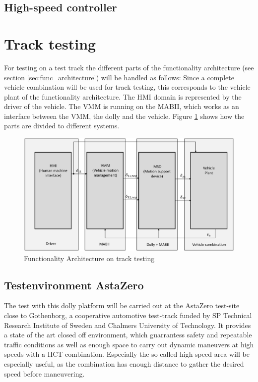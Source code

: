 \documentclass[ExampleMasters.tex]{subfiles}
\begin{document}
\subsection{High-speed controller}

\section{Track testing}
\label{sec:track-testing}
For testing on a test track the different parts of the  functionality architecture (see section \ref{sec:func_architecture}) will be handled as follows:
Since a complete vehicle combination will be used for track testing, this corresponds to the vehicle plant of the functionality architecture. The \gls{HMI} domain is represented by the driver of the vehicle. The \gls{VMM} is running on the \gls{MABII}, which works as an interface between the \gls{VMM}, the dolly and the vehicle. Figure \ref{fig:funct_architecture_track} shows how the parts are divided to different systems.

\begin{figure}[!htb]
	\centering
	\includegraphics[width=0.5\linewidth]{figures/functionality_architecture_track}
	
	\caption{Functionality Architecture on track testing}
	\label{fig:funct_architecture_track}
\end{figure} 

\subsection{Testenvironment AstaZero}


The test with this dolly platform will be carried out at the AstaZero test-site close to Gothenborg, a cooperative automotive test-track funded by SP Technical Research Institute of Sweden and Chalmers University of Technology. It provides a state of the art closed off environment, which guarrantess safety and repeatable traffic conditions as well as enough space to carry out dynamic maneuvers at high speeds with a \gls{HCT} combination. Especially the so called high-speed area will be especially useful, as the combination has enough distance to gather the desired speed before maneuvering.
\end{document}
